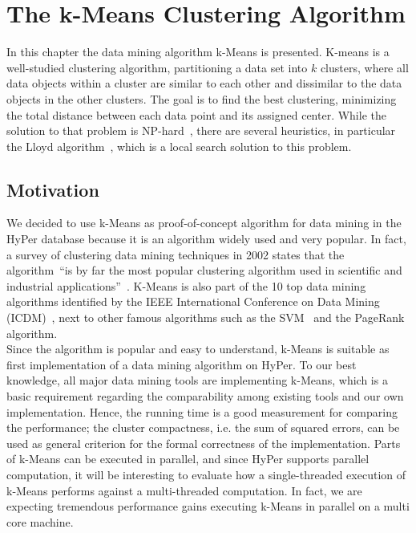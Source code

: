 \chapter{The k-Means Clustering Algorithm}\label{chapter:kmeans}

In this chapter the data mining algorithm k-Means is presented. K-means is a well-studied clustering algorithm, partitioning a data set into $k$ clusters, where all data objects within a cluster are similar to each other and dissimilar to the data objects in the other clusters. The goal is to find the best clustering, minimizing the total distance between each data point and its assigned center. While the solution to that problem is NP-hard~\parencite{nphard1}\parencite{nphard2}, there are several heuristics, in particular the Lloyd algorithm~\parencite{Lloyd82}, which is a local search solution to this problem.

\section{Motivation}
 
We decided to use k-Means as proof-of-concept algorithm for data mining in the HyPer database because it is an algorithm widely used and very popular. In fact, a survey of clustering data mining techniques in 2002 states that the algorithm~\enquote{is by far the most popular clustering algorithm used in scientific and industrial applications}~\parencite{berkhin2002survey}. K-Means is also part of the 10 top data mining algorithms identified by the IEEE International Conference on Data Mining (ICDM)~\parencite{top10}, next to other famous algorithms such as the SVM~\parencite{svm} and the PageRank~\parencite{pagerank} algorithm. 
\\
Since the algorithm is popular and easy to understand, k-Means is suitable as first implementation of a data mining algorithm on HyPer. To our best knowledge, all major data mining tools are implementing k-Means, which is a basic requirement regarding the comparability among existing tools and our own implementation. Hence, the running time is a good measurement for comparing the performance; the cluster compactness, i.e. the sum of squared errors, can be used as general criterion for the formal correctness of the implementation. 
Parts of k-Means can be executed in parallel, and since HyPer supports parallel computation, it will be interesting to evaluate how a single-threaded execution of k-Means performs against a multi-threaded computation. In fact, we are expecting tremendous performance gains executing k-Means in parallel on a multi core machine.

